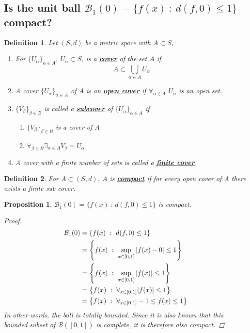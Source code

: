 \documentclass[]{article}
\newcommand{\st}{\ : \ }
\newtheorem{definition}{Definition}
\newtheorem{proposition}{Proposition}
\begin{document}
\subsection{Is the unit ball $\mathcal{B}_1(0) = \{f(x) \st d(f,0) \leq 1\}$ compact?}
\begin{definition}
    Let $(S,d)$ be a metric space with $A \subset S$,
    \begin{enumerate}
        \item For $\{U_\alpha\}_{\alpha \in A}, \ U_\alpha \subset S$, is a \textbf{\underline{cover}} of the set $A$ if 
        $$A \subset \bigcup_{\alpha\in A} U_\alpha$$
        \item A cover $\{U_\alpha\}_{\alpha \in A}$ of $A$ is an \textbf{\underline{open cover}} if $\forall_{\alpha \in A}$ $U_\alpha$ is an open set.
        \item $\{V_\beta\}_{\beta\in B}$ is called a \textbf{\underline{subcover}} of $\{U_\alpha\}_{\alpha \in A}$ if
        \begin{enumerate}
            \item $\{V_\beta\}_{\beta\in B}$ is a cover of $A$
            \item $\forall_{\beta \in B} \exists_{\alpha \in A} V_\beta = U_\alpha$
        \end{enumerate}
        \item A cover with a finite number of sets is called a \textbf{\underline{finite cover}}.
    \end{enumerate}
\end{definition}
\begin{definition}
    For $A \subset (S,d)$, $A$ is \textbf{\underline{compact}} if for every open cover of $A$ there exists a finite sub cover.
\end{definition}

\begin{proposition}
    $\mathcal{B}_1(0) = \{f(x) \st d(f,0) \leq 1\}$ is compact.
    \begin{proof}
        \begin{align*}
            \mathcal{B}_1(0) &= \qty{f(x) \st d(f,0) \leq 1}\\
            &= \qty{f(x) \st \sup_{x \in [0,1]} \abs{f(x) - 0} \leq 1}\\
            &= \qty{f(x) \st \sup_{x \in [0,1]} \abs{f(x)} \leq 1}\\
            &= \qty{f(x) \st \forall_{x \in [0,1]} \abs{f(x)} \leq 1}\\
            &= \qty{f(x) \st \forall_{x \in [0,1]} -1 \leq f(x) \leq 1}\\
        \end{align*}
        In other words, the ball is totally bounded. 
        Since it is also known that this bounded subset of $\mathcal{B}([0,1])$ is complete, it is therefore also compact.
    \end{proof}
\end{proposition}
\end{document}
